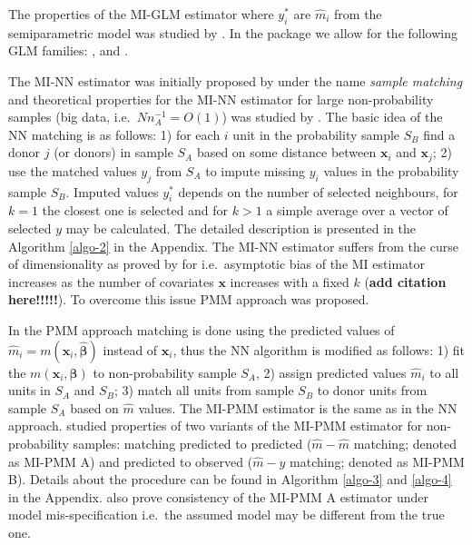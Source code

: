 \documentclass[
]{jss}
\begin{document}
The properties of the MI-GLM estimator where \(y_i^*\) are \(\hat{m}_i\)
from the semiparametric model was studied by \citet{kim_combining_2021}.
In the  package we allow for the following GLM families:
,  and .

The MI-NN estimator was initially proposed by \citet{rivers2007sampling}
under the name \textit{sample matching} and theoretical properties for
the MI-NN estimator for large non-probability samples (big data,
i.e.~\(N n_A^{-1}=O(1)\)) was studied by \citet{yang2021integration}.
The basic idea of the NN matching is as follows: 1) for each \(i\) unit
in the probability sample \(S_B\) find a donor \(j\) (or donors) in
sample \(S_A\) based on some distance between \(\boldsymbol{x}_i\) and
\(\boldsymbol{x}_j\); 2) use the matched values \(y_j\) from \(S_A\) to
impute missing \(y_i\) values in the probability sample \(S_B\). Imputed
values \(y_i^*\) depends on the number of selected neighbours, for
\(k=1\) the closest one is selected and for \(k>1\) a simple average
over a vector of selected \(y\) may be calculated. The detailed
description is presented in the Algorithm \ref{algo-2} in the Appendix.
The MI-NN estimator suffers from the curse of dimensionality as proved
by for i.e.~asymptotic bias of the MI estimator increases as the number
of covariates \(\boldsymbol{x}\) increases with a fixed \(k\)
(\textbf{add citation here!!!!!}). To overcome this issue PMM approach
was proposed.

In the PMM approach matching is done using the predicted values of
\(\hat{m}_i=m\left(\boldsymbol{x}_i, \hat{\boldsymbol{\beta}}\right)\)
instead of \(\boldsymbol{x}_i\), thus the NN algorithm is modified as
follows: 1) fit the
\(m\left(\boldsymbol{x}_i, \boldsymbol{\beta}\right)\) to
non-probability sample \(S_A\), 2) assign predicted values \(\hat{m}_i\)
to all units in \(S_A\) and \(S_B\); 3) match all units from sample
\(S_B\) to donor units from sample \(S_A\) based on \(\hat{m}\) values.
The MI-PMM estimator is the same as in the NN approach.
\citet{chlebicki2025} studied properties of two variants of the MI-PMM
estimator for non-probability samples: matching predicted to predicted
(\(\hat{m}-\hat{m}\) matching; denoted as MI-PMM A) and predicted to
observed (\(\hat{m}-y\) matching; denoted as MI-PMM B). Details about
the procedure can be found in Algorithm \ref{algo-3} and \ref{algo-4} in
the Appendix. \citet{chlebicki2025} also prove consistency of the MI-PMM
A estimator under model mis-specification i.e.~the assumed model may be
different from the true one.
\end{document}
